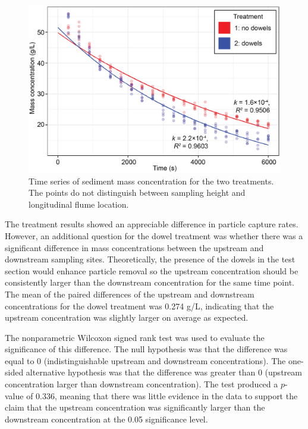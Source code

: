 \documentclass[12pt]{article}
\begin{document}
\begin{figure}[H]
    \centering
    \includegraphics[width=6.5in]{timeseries.png}
    \caption{Time series of sediment mass concentration for the two treatments. The points do not distinguish between sampling height and longitudinal flume location.}
    \label{fig_timeseries}
\end{figure}

The treatment results showed an appreciable difference in particle capture rates. However, an additional question for the dowel treatment was whether there was a significant difference in mass concentrations between the upstream and downstream sampling sites. Theoretically, the presence of the dowels in the test section would enhance particle removal so the upstream concentration should be consistently larger than the downstream concentration for the same time point. The mean of the paired differences of the upstream and downstream concentrations for the dowel treatment was 0.274 g/L, indicating that the upstream concentration was slightly larger on average as expected.

The nonparametric Wilcoxon signed rank test was used to evaluate the significance of this difference. The null hypothesis was that the difference was equal to 0 (indistinguishable upstream and downstream concentrations). The one-sided alternative hypothesis was that the difference was greater than 0 (upstream concentration larger than downstream concentration). The test produced a $p$-value of 0.336, meaning that there was little evidence in the data to support the claim that the upstream concentration was significantly larger than the downstream concentration at the 0.05 significance level.
\end{document}
